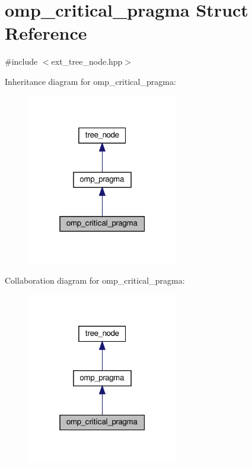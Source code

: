 \hypertarget{structomp__critical__pragma}{}\section{omp\+\_\+critical\+\_\+pragma Struct Reference}
\label{structomp__critical__pragma}


{\ttfamily \#include $<$ext\+\_\+tree\+\_\+node.\+hpp$>$}



Inheritance diagram for omp\+\_\+critical\+\_\+pragma\+:
\nopagebreak
\begin{figure}[H]
\begin{center}
\leavevmode
\includegraphics[width=187pt]{d2/d75/structomp__critical__pragma__inherit__graph}
\end{center}
\end{figure}


Collaboration diagram for omp\+\_\+critical\+\_\+pragma\+:
\nopagebreak
\begin{figure}[H]
\begin{center}
\leavevmode
\includegraphics[width=187pt]{d6/d82/structomp__critical__pragma__coll__graph}
\end{center}
\end{figure}
